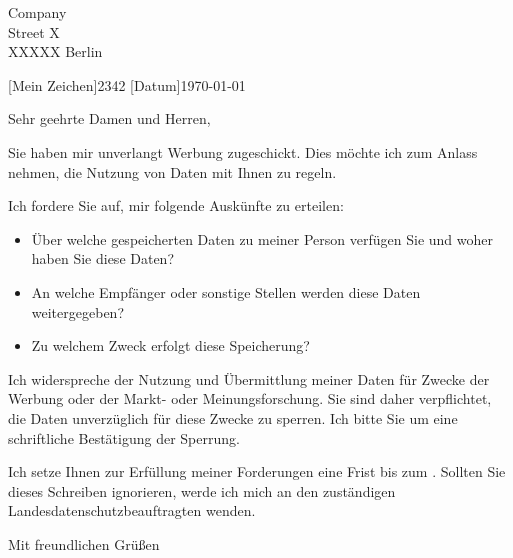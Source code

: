\documentclass[briefvorlage,
   parskip=half,%
   fromfax=on,%
   fromemail=on,%
   locfield=wide,%
   draft=false%
]{scrlttr2}
\begin{document}
 \begin{letter}{
Company\\
Street X\\
XXXXX Berlin}


[\normalfont Mein Zeichen]{2342}
[\normalfont Datum]{\today}
\opening{Sehr geehrte Damen und Herren,}

Sie haben mir unverlangt Werbung zugeschickt. Dies möchte ich zum Anlass nehmen, die Nutzung von Daten mit Ihnen zu regeln.

Ich fordere Sie auf, mir folgende Auskünfte zu erteilen:

\begin{itemize}
\item Über welche gespeicherten Daten zu meiner Person verfügen Sie und woher haben Sie diese Daten?

\item An welche Empfänger oder sonstige Stellen werden diese Daten weitergegeben?

\item Zu welchem Zweck erfolgt diese Speicherung?

\end{itemize}

Ich widerspreche der Nutzung und Übermittlung meiner Daten für Zwecke der Werbung oder der Markt- oder Meinungsforschung. Sie sind daher verpflichtet, die Daten unverzüglich für diese Zwecke zu sperren. Ich bitte Sie um eine schriftliche Bestätigung der Sperrung.

Ich setze Ihnen zur Erfüllung meiner Forderungen eine Frist bis zum \DayAfter[21]. Sollten Sie dieses Schreiben ignorieren, werde ich mich an den zuständigen Landesdatenschutzbeauftragten wenden.

\closing{Mit freundlichen Grüßen}
\end{letter}

 
\end{document}
